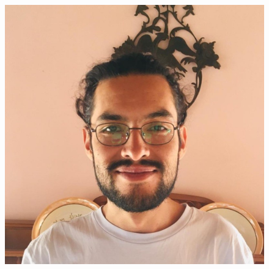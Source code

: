 \documentclass[a4paper,12pt,final]{memoir}
\begin{document}
%
\begin{figure}
	\includegraphics[width=0.75\columnwidth]{my-pic.jpeg}
	\vspace{-2cm}
\end{figure}
\end{document}
